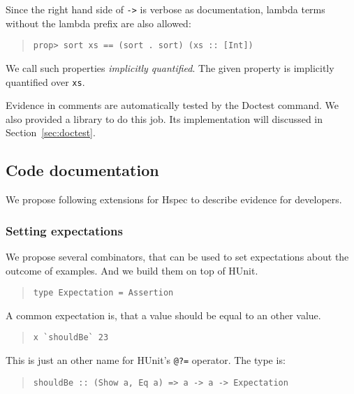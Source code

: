 \documentclass[preprint]{sigplanconf}
\begin{document}
\noindent Since the right hand side of {\tt ->} is verbose as documentation,
lambda terms without the lambda prefix are also allowed:

\begin{quote}
\small
\begin{verbatim}
prop> sort xs == (sort . sort) (xs :: [Int])
\end{verbatim}
\end{quote}

\noindent We call such properties \emph{implicitly quantified}.  The
given property is implicitly quantified over \verb|xs|.

Evidence in comments are automatically
tested by the Doctest command. We also provided a library
to do this job. Its implementation will discussed in Section~\ref{sec:doctest}.

\subsection{Code documentation}
\label{sec:code-doc}

We propose following extensions for Hspec to
describe evidence for developers.

\subsubsection{Setting expectations}

We propose several combinators, that can be used to set expectations
about the outcome of examples.  And we build them on top of
HUnit.

\begin{quote}\small\begin{verbatim}
type Expectation = Assertion
\end{verbatim}\end{quote}

\noindent A common expectation is, that a value should be equal to an other
value.

\begin{quote}\small\begin{verbatim}
x `shouldBe` 23
\end{verbatim}\end{quote}

\noindent This is just an other name for HUnit's \texttt{@?=}
operator.  The type is:

\begin{quote}\small\begin{verbatim}
shouldBe :: (Show a, Eq a) => a -> a -> Expectation
\end{verbatim}\end{quote}
\end{document}
